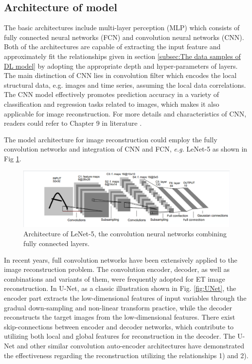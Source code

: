 \subsection{Architecture of model}
\label{subsec:Architecture of model}

The basic architectures include multi-layer perception (MLP) which consists of fully connected neural networks (FCN) and convolution neural networks (CNN).
Both of the architectures are capable of extracting the input feature and approximately fit the relationships given in section \ref{subsec:The data samples of DL model} by adopting the appropriate depth and hyper-parameters of layers. The main distinction of CNN lies in convolution filter which encodes the local structural data, e.g. images and time series, assuming the local data correlations. The CNN model effectively promotes prediction accuracy in a variety of classification and regression tasks related to images, which makes it also applicable for image reconstruction. For more details and characteristics of CNN, readers could refer to Chapter 9 in literature \cite{Goodfellow2016Deep}.

The model architecture for image reconstruction could employ the fully convolution networks and integration of CNN and FCN, \emph{e.g.} LeNet-5\cite{Lecun1998Gradient,Chao2019Image,Guo2019} as shown in Fig \ref{fig:LeNet}.

\begin{figure}[h]
  \centering
  \includegraphics[width=0.99\columnwidth]{figures/LeNet.pdf}
  \caption{Architecture of LeNet-5\cite{Lecun1998Gradient}, the convolution neural networks combining fully connected layers.}\label{fig:LeNet}
\end{figure}

In recent years, full convolution networks have been extensively applied to the image reconstruction problem. The convolution encoder, decoder, as well as combinations and variants of them, were frequently adopted for ET image reconstruction. In U-Net\cite{ronneberger2015unet}, as a classic illustration shown in Fig. \ref{fig:UNet}, the encoder part extracts the low-dimensional features of input variables through the gradual down-sampling and non-linear transform practice, while the decoder reconstructs the target images from the low-dimensional features. There exist skip-connections between encoder and decoder networks, which contribute to utilizing both local and global features for reconstruction in the decoder. The U-Net and other similar convolution auto-encoder architectures have demonstrated the effectiveness regarding the reconstruction utilizing the relationships 1) and 2).

